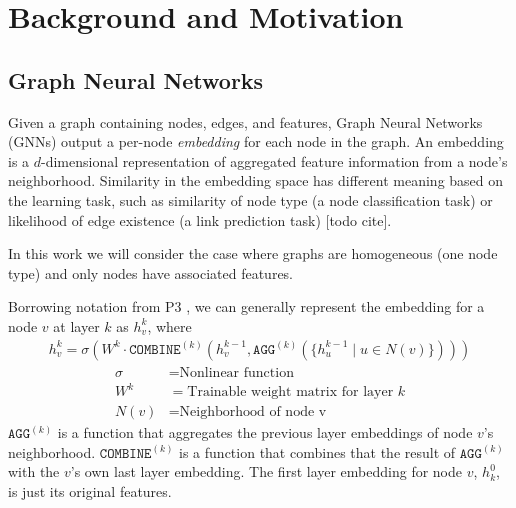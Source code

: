 \chapter{Background and Motivation}

\section{Graph Neural Networks}
Given a graph containing nodes, edges, and features, Graph Neural Networks (GNNs) output a per-node \textit{embedding} for each node in the graph.
An embedding is a $d$-dimensional representation of aggregated feature information from a node's neighborhood. 
Similarity in the embedding space has different meaning based on the learning task, such as similarity of node type (a node classification task) or likelihood of edge existence (a link prediction task) [todo cite]. 

In this work we will consider the case where graphs are homogeneous (one node type) and only nodes have associated features.

Borrowing notation from P3 \cite{P3_2021}, we can generally represent the embedding for a node $v$ at layer $k$ as $h_v^k$, where
\begin{align} \label{GNN Equation}
    h_v^k = \sigma \left(
         W^k \cdot 
         \mathtt{COMBINE}^{(k)} \left(
            h_v^{k-1},
            \mathtt{AGG}^{(k)} \left( 
                    \{ h_u^{k-1} \mid u \in N(v) \}
                \right) 
         \right)
     \right)
\end{align}
\begin{align*}
    \sigma &= \text{Nonlinear function} \\
    W^k &= \text{Trainable weight matrix for layer $k$} \\
    N(v) &= \text{Neighborhood of node v}
\end{align*}
$\mathtt{AGG}^{(k)}$ is a function that aggregates the previous layer embeddings of node $v$'s neighborhood. 
$\mathtt{COMBINE}^{(k)}$ is a function that combines that the result of $\mathtt{AGG}^{(k)}$ with the $v$'s own last layer embedding. 
The first layer embedding for node $v$, $h_k^0$, is just its original features.

